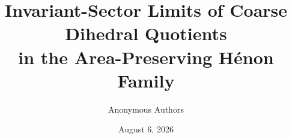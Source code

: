 \documentclass[11pt]{article}
\title{Invariant-Sector Limits of Coarse Dihedral Quotients\\
in the Area-Preserving H\'enon Family}
\author{Anonymous Authors}
\date{August 6, 2026}
\theoremstyle{definition}
\theoremstyle{remark}
\begin{document}
\maketitle
\begin{abstract}

\end{abstract}







\appendix




\end{document}
